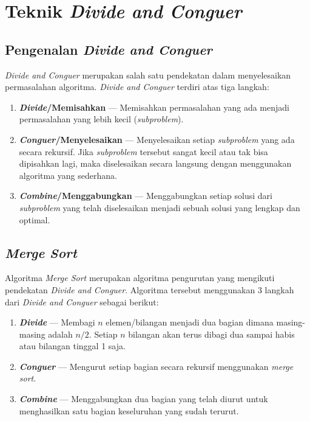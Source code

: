 \chapter{Teknik \textit{Divide and Conguer}}\label{ch:modul4}


\section{Pengenalan \textit{Divide and Conguer}}
\textit{Divide and Conguer} merupakan salah satu pendekatan dalam menyelesaikan permasalahan algoritma. \textit{Divide and Conguer} terdiri atas tiga langkah:
\begin{enumerate}
	\item \textbf{\textit{Divide}/Memisahkan} --- Memisahkan permasalahan yang ada menjadi permasalahan yang lebih kecil (\textit{subproblem}).
	\item \textbf{\textit{Conguer}/Menyelesaikan} --- Menyelesaikan setiap \textit{subproblem} yang ada secara rekursif. Jika \textit{subproblem} tersebut sangat kecil atau tak bisa dipisahkan lagi, maka diselesaikan secara langsung dengan menggunakan algoritma yang sederhana.
	\item \textbf{\textit{Combine}/Menggabungkan} --- Menggabungkan setiap solusi dari \textit{subproblem} yang telah diselesaikan menjadi sebuah solusi yang lengkap dan optimal.
\end{enumerate}




\section{\textit{Merge Sort}}
Algoritma \textit{Merge Sort} merupakan algoritma pengurutan yang mengikuti pendekatan \textit{Divide and Conguer}. Algoritma tersebut menggunakan 3 langkah dari \textit{Divide and Conguer} sebagai berikut:
\begin{enumerate}
	\item \textbf{\textit{Divide}} --- Membagi $n$ elemen/bilangan menjadi dua bagian dimana masing-masing adalah $n/2$. Setiap $n$ bilangan akan terus dibagi dua sampai habis atau bilangan tinggal 1 saja.
	\item \textbf{\textit{Conguer}} --- Mengurut setiap bagian secara rekursif menggunakan \textit{merge sort}. 
	\item \textbf{\textit{Combine}} --- Menggabungkan dua bagian yang telah diurut untuk menghasilkan satu bagian keseluruhan yang sudah terurut.
\end{enumerate}


